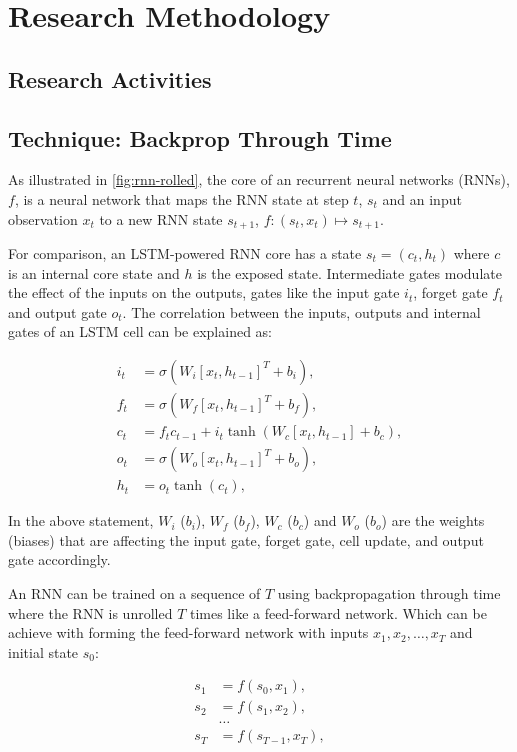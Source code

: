\chapter{Research Methodology}
\label{chap:method}

\section{Research Activities}



\section{Technique: Backprop Through Time}
\label{sec:bptt}

As illustrated in \ref{fig:rnn-rolled}, the core of an recurrent neural networks (RNNs), $f$, is a neural network that maps the RNN state at step $t$, $s_t$ and an input observation $x_t$ to a new RNN state $s_{t+1}$, $f: (s_t, x_t) \mapsto s_{t+1}$.

For comparison, an LSTM-powered RNN core \cite{Hochreiter1997} has a state $s_t = (c_t, h_t)$ where $c$ is an internal core state and $h$ is the exposed state. Intermediate gates modulate the effect of the inputs on the outputs, gates like the input gate $i_t$, forget gate $f_t$ and output gate $o_t$. The correlation between the inputs, outputs and internal gates of an LSTM cell can be explained as:

\begin{align*}
i_t &= \sigma(W_i [x_t, h_{t-1}]^T + b_i), \\
f_t &= \sigma(W_f [x_t, h_{t-1}]^T + b_f), \\
c_t &= f_t c_{t-1} + i_t \tanh(W_c [x_t, h_{t-1}] + b_c), \\
o_t &= \sigma(W_o [x_t, h_{t-1}]^T + b_o), \\
h_t &= o_t \tanh(c_t),
\end{align*}

In the above statement, $W_i$ ($b_i$), $W_f$ ($b_f$), $W_c$ ($b_c$) and $W_o$ ($b_o$) are the weights (biases) that are affecting the input gate, forget gate, cell update, and output gate accordingly.

An RNN can be trained on a sequence of $T$ using backpropagation through time where the RNN is unrolled $T$ times like a feed-forward network.
Which can be achieve with forming the feed-forward network with inputs
$x_1, x_2, \dots, x_T$ and initial state $s_0$:

\begin{align}
s_1 &= f(s_0, x_1), \nonumber \\
s_2 &= f(s_1, x_2), \nonumber \\
&\dots \nonumber \\
\label{eq:unroll}
s_T &= f(s_{T-1}, x_T), 
\end{align}

